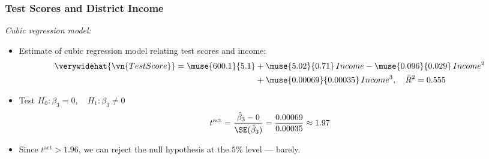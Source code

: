 

\begin{frame}
\frametitle{Test Scores and District Income}
\emph{Cubic regression model:}
\begin{itemize}
\item Estimate of cubic regression model relating test scores and income:
\begin{align*}
\verywidehat{\vn{TestScore}} 
  = \muse{600.1}{5.1} & + \muse{5.02}{0.71}\,Income - \muse{0.096}{0.029}\,Income^2\\
                     & + \muse{0.00069}{0.00035}\,Income^3, \quad \bar{R}^2 = 0.555
\end{align*}
\item Test $H_{0}\colon\beta_{3}=0, \quad H_{1}\colon\beta_{3}\ne0$
\begin{align*}
t^{\text{act}} 
  = \frac{\hat{\beta}_{3}-0}{\SE(\hat{\beta}_{3})}
  = \frac{0.00069}{0.00035}
  \approx 1.97
\end{align*}
\item Since $t^{\text{act}}>1.96$, we can reject the null hypothesis at the $5\%$ level --- barely. 
\end{itemize}
\end{frame}
